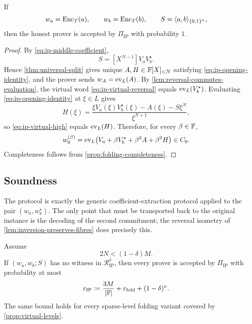 \begin{theorem}
\label{thm:ip-completeness}
If
\[
  w_a=\operatorname{Enc}_T(a),
  \qquad
  w_b=\operatorname{Enc}_T(b),
  \qquad
  S=\langle a,b\rangle_{\{0,1\}^n},
\]
then the honest prover is accepted by $\Pi_{\mathrm{IP}}$ with probability $1$.
\end{theorem}

\begin{proof}
By \eqref{eq:ip-middle-coefficient},
\[
  S=[X^{N-1}]V_aV_b^{\star}.
\]
Hence \cref{thm:universal-split} gives unique $A,H\in\mathbb{F}[X]_{<N}$ satisfying \eqref{eq:ip-opening-identity}, and the prover sends $w_A=\operatorname{ev}_L(A)$.  By \cref{lem:reversal-commutes-evaluation}, the virtual word \eqref{eq:ip-virtual-reversal} equals $\operatorname{ev}_L(V_b^{\star})$.  Evaluating \eqref{eq:ip-opening-identity} at $\xi\in L$ gives
\[
  H(\xi)
  =\frac{\xi V_a(\xi)V_b^{\star}(\xi)-A(\xi)-S\xi^N}{\xi^{N+1}},
\]
so \eqref{eq:ip-virtual-high} equals $\operatorname{ev}_L(H)$.  Therefore, for every $\beta\in\mathbb{F}$,
\[
  w_0^{(\beta)}
  =\operatorname{ev}_L\!\left(V_a+\beta V_b^{\star}+\beta^2A+\beta^3H\right)
  \in C_0.
\]
Completeness follows from \cref{prop:folding-completeness}.
\end{proof}

\subsection{Soundness}
\label{sec:ip-soundness}

The protocol is exactly the generic coefficient-extraction protocol applied to the pair $(w_a,w_b^{\star})$.  The only point that must be transported back to the original instance is the decoding of the second commitment; the reversal isometry of \cref{lem:inversion-preserves-fibres} does precisely this.

\begin{theorem}
\label{thm:ip-soundness}
Assume
\begin{equation}
  2N<(1-\delta)M.
  \label{eq:ip-degree-margin}
\end{equation}
If $(w_a,w_b;S)$ has no witness in $\mathcal R^{\delta}_{\mathrm{IP}}$, then every prover is accepted by $\Pi_{\mathrm{IP}}$ with probability at most
\begin{equation}
  \varepsilon_{\mathrm{IP}}
  \coloneqq
  \frac{3M}{|\mathbb{F}|}
  +\varepsilon_{\mathrm{fold}}
  +(1-\delta)^\kappa.
  \label{eq:ip-soundness-bound}
\end{equation}
The same bound holds for every sparse-level folding variant covered by \cref{prop:virtual-levels}.
\end{theorem}

